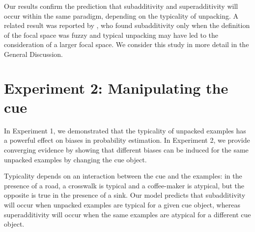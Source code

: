 Our results confirm the prediction that subadditivity and superadditivity will occur within the same paradigm, depending on the typicality of unpacking. A related result was reported by \cite{super}, who found subadditivity only when the definition of the focal space was fuzzy and typical unpacking may have led to the consideration of a larger focal space. We consider this study in more detail in the General Discussion.

\section{Experiment 2: Manipulating the cue}

In Experiment 1, we demonstrated that the typicality of unpacked examples has a powerful effect on biases in probability estimation. In Experiment 2, we provide converging evidence by showing that different biases can be induced for the same unpacked examples by changing the cue object.

Typicality depends on an interaction between the cue and the examples: in the presence of a road, a crosswalk is typical and a coffee-maker is atypical, but the opposite is true in the presence of a sink. Our model predicts that subadditivity will occur when unpacked examples are typical for a given cue object, whereas superadditivity will occur when the same examples are atypical for a different cue object.



